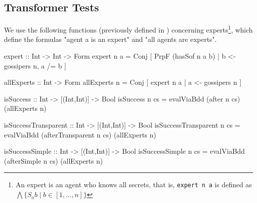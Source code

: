 \subsection{Transformer Tests}
We use the following functions (previously defined in \cite{GattingerThesis2018}) concerning experts\footnote{An expert is an
agent who knows all secrets, that is, \texttt{expert n a} is defined as
$\bigwedge \{S_a b\mid b\in [1,...,n]\}$},
which define the formulas "agent a is an expert" and "all agents are experts".

\begin{showCode}
    expert :: Int -> Int -> Form
    expert n a = Conj [ PrpF (hasSof n a b) | b <- gossipers n, a /= b ]

    allExperts :: Int -> Form
    allExperts n = Conj [ expert n a | a <- gossipers n ]

    isSuccess :: Int -> [(Int,Int)] -> Bool
    isSuccess n cs = evalViaBdd (after n cs) (allExperts n)

    isSuccessTransparent :: Int -> [(Int,Int)] -> Bool
    isSuccessTransparent n cs = evalViaBdd (afterTransparent n cs) (allExperts n)

    isSuccessSimple :: Int -> [(Int,Int)] -> Bool
    isSuccessSimple n cs = evalViaBdd (afterSimple n cs) (allExperts n)
\end{showCode}
